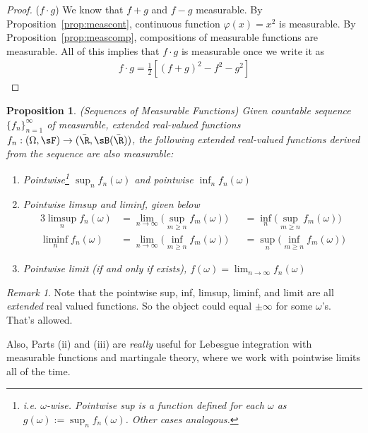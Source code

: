 \documentclass[12pt]{article}
\theoremstyle{plain}
\newtheorem{prop}[thm]{Proposition}
\theoremstyle{definition}
\theoremstyle{remark}
\newtheorem*{rmk}{Remark}
\newcommand{\ra}{\rightarrow}
\newcommand{\ninf}{_{n=1}^\infty}
\newcommand{\limn}{\lim_{n\rightarrow\infty}}
\begin{document}
\begin{proof}
($f\cdot g$)
We know that $f+g$ and $f-g$ measurable.
By Proposition~\ref{prop:meascont}, continuous function $\varphi(x)=x^2$
is measurable.
By Proposition~\ref{prop:meascomp}, compositions of measurable
functions are measurable. All of this implies that $f\cdot g$ is measurable
once we write it as
\begin{align*}
  f\cdot g
  =
  \frac{1}{2}
  \left[
  (f+g)^2 - f^2 - g^2
  \right]
\end{align*}
\end{proof}


\begin{prop}\emph{(Sequences of Measurable Functions)}
Given countable sequence $\{f_n\}\ninf$ of measurable, extended
real-valued functions $f_n:(\Omega,\sF)\ra(\bar{\R},\sB(\bar{\R}))$,
the following extended real-valued functions derived from the sequence
are also measurable:
\begin{enumerate}[label=\emph{(\roman*)}]
  \item Pointwise\footnote{
      i.e. $\omega$-wise.
      Pointwise sup is a function defined for each $\omega$ as
      $g(\omega):=\sup_nf_n(\omega)$.
      Other cases analogous.
    }
    $\sup_n f_n(\omega)$ and pointwise $\inf_n f_n(\omega)$
  \item Pointwise limsup and liminf, given below
    \begin{alignat*}{3}
      \limsup_n f_n(\omega)
      &= \limn \bigg(\sup_{m\geq n} f_m(\omega) \bigg)
      &&=
        \inf_n\bigg(\sup_{m\geq n} f_m(\omega)\bigg) \\
      \liminf_n f_n(\omega)
      &= \limn \bigg(\inf_{m\geq n} f_m(\omega) \bigg)
      &&= \sup_n\bigg(\inf_{m\geq n} f_m(\omega)\bigg)
    \end{alignat*}
  \item Pointwise limit (if and only if exists),
    $f(\omega) = \limn f_n(\omega)$
\end{enumerate}
\end{prop}
\begin{rmk}
Note that the pointwise sup, inf, limsup, liminf, and limit are all
\emph{extended} real valued functions. So the object could equal
$\pm\infty$ for some $\omega$'s. That's allowed.

Also, Parts (ii) and (iii) are \emph{really} useful for Lebesgue
integration with measurable functions and martingale theory, where we
work with pointwise limits all of the time.
\end{rmk}
\end{document}
